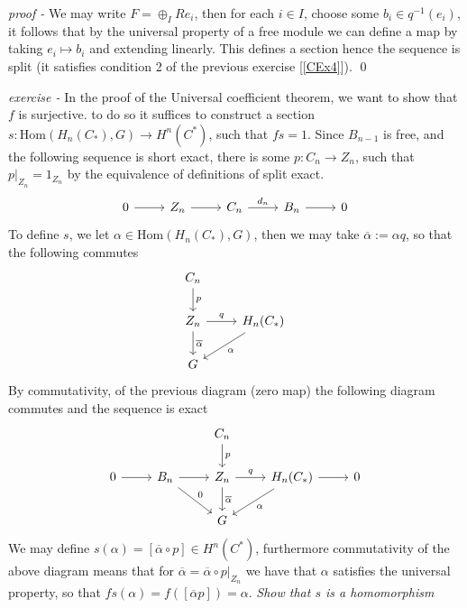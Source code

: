 \documentclass[11pt]{article}
\theoremstyle{definition}
\newcommand{\homo}{\text{Hom}}
\begin{document}
    \emph{proof - } We may write \(F = \oplus_I Re_i\), then for each \(i \in I\), choose some \(b_i \in q^{-1}(e_i)\), it follows that by the universal property of a free module we can define a map by taking \(e_i \mapsto b_i\) and extending linearly. This defines a section hence the sequence is split (it satisfies condition 2 of the previous exercise [\ref{CEx4}]). \qed


    \emph{exercise - }\label{CEx6} In the proof of the Universal coefficient theorem, we want to show that \(f\) is surjective. to do so it suffices to construct a section \(s: \homo(H_n(C_*),G) \to H^n(C^*)\), such that \(fs =1\). Since \(B_{n-1}\) is free, and the following sequence is short exact, there is some \(p: C_n \to Z_n\), such that \(p\vert_{Z_n} = 1_{Z_n}\) by the equivalence of definitions of split exact.
    \begin{equation*}
        \begin{tikzcd}
            0 \arrow[r,"{}"] & Z_n \arrow[r,"{}"] & C_n \arrow[r,"{d_n}"] & B_n \arrow[r,"{}"] & 0
        \end{tikzcd}
    \end{equation*}
    To define \(s\), we let \(\alpha \in \homo(H_n(C_*),G)\), then we may take \(\overline{\alpha} := \alpha q\), so that the following commutes
    \begin{equation*}
        \begin{tikzcd}
            C_n \arrow[d,"{p}"] \\
            Z_n \arrow[d,"{\overline{\alpha}}"] \arrow[r,"{q}"] & H_n(C_*) \arrow[ld,"{\alpha}"]\\
            G
        \end{tikzcd}
    \end{equation*}
    By commutativity, of the previous diagram (zero map) the following diagram commutes and the sequence is exact
    \begin{equation*}
        \begin{tikzcd}
            & &C_n \arrow[d,"{p}"] \\
            0 \arrow[r,"{}"] & B_n \arrow[rd,"{0}"] \arrow[r,"{}"] & Z_n \arrow[d,"{\overline{\alpha}}"] \arrow[r,"{q}"] & H_n(C_*) \arrow[ld,"{\alpha}"] \arrow[r,"{}"] & 0\\
            & &G
        \end{tikzcd}
    \end{equation*}
    We may define \(s(\alpha) = [\overline{\alpha} \circ p] \in H^n(C^*)\), furthermore commutativity of the above diagram means that for \(\overline{\alpha} = \overline{\alpha} \circ p \vert_{Z_n}\) we have that \(\alpha\) satisfies the universal property, so that \(fs(\alpha) = f([\overline{\alpha}p]) = \alpha\).
    \emph{Show that \(s\) is a homomorphism}
\end{document}

